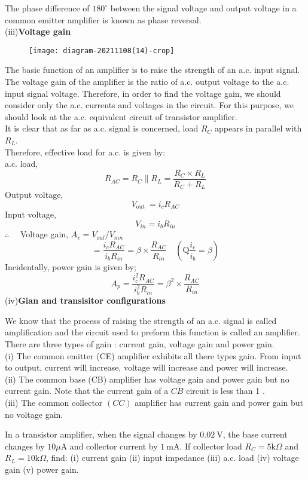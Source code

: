 The phase difference of $180^{\circ}$ between the signal voltage and output voltage in a common emitter amplifier is known as phase reversal.\\
(iii)\textbf{Voltage gain}\\
\begin{figure}[H]
	\centering
	\texttt{[image: diagram-20211108(14)-crop]}
	\caption{}
	\label{}
\end{figure}
\par The basic function of an amplifier is to raise the strength of an a.c. input signal. The voltage gain of the amplifier is the ratio of a.c. output voltage to the a.c. input signal voltage. Therefore, in order to find the voltage gain, we should consider only the a.c. currents and voltages in the circuit. For this purpose, we should look at the a.c. equivalent circuit of transistor amplifier.\\
It is clear that as far as a.c. signal is concerned, load $R_{C}$ appears in parallel with $R_{L}$.\\ Therefore, effective load for a.c. is given by:\\
a.c. load, $$R_{A C}=R_{C} \| R_{L}=\frac{R_{C} \times R_{L}}{R_{C}+R_{L}}$$
Output voltage, $$V_{\text {out }}=i_{c} R_{A C}$$
Input voltage, $$V_{i n}=i_{b} R_{i n}$$
$\therefore \quad$ Voltage gain, $A_{v}=V_{o u l} / V_{\dot{m} n}$
$$
=\frac{i_{c} R_{A C}}{i_{b} R_{i n}}=\beta \times \frac{R_{A C}}{R_{i n}} \quad\left(\mathrm{Q} \frac{i_{c}}{i_{b}}=\beta\right)
$$
Incidentally, power gain is given by;
$$
A_{p}=\frac{i_{c}^{2} R_{A C}}{i_{b}^{2} R_{i n}}=\beta^{2} \times \frac{R_{A C}}{R_{i n}}
$$
(iv)\textbf{Gian and transisitor configurations}
\par We know that the process of raising the strength of an a.c. signal is called amplification and the circuit used to preform this function is called an amplifier. There are three types of gain : current gain, voltage gain and power gain.\\
(i) The common emitter (CE) amplifier exhibits all there types gain. From input to output, current will increase, voltage will increase and power will increase.\\
(ii) The common base (CB) amplifier has voltage gain and power gain but no current gain. Note that the current gain of a $C B$ circuit is less than 1 .\\
(iii) The common collector $(C C)$ amplifier has current gain and power gain but no voltage gain.
\begin{exercise}
	 In a transistor amplifier, when the signal changes by $0.02 \mathrm{~V}$, the base current changes by $10 \mu \mathrm{A}$ and collector current by $1 \mathrm{~mA}$. If collector load $R_{C}=5 \mathrm{k} \Omega$ and $R_{L}=10 \mathrm{k} \Omega$, find: (i) current gain (ii) input impedance (iii) a.c. load (iv) voltage gain (v) power gain.
\end{exercise}
